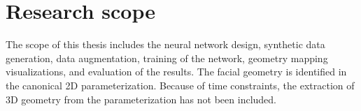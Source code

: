 \section{Research scope}

The scope of this thesis includes the neural network design, synthetic data generation, data augmentation, training of the network, geometry mapping visualizations, and evaluation of the results. The facial geometry is identified in the canonical 2D parameterization. Because of time constraints, the extraction of 3D geometry from the parameterization has not been included.

